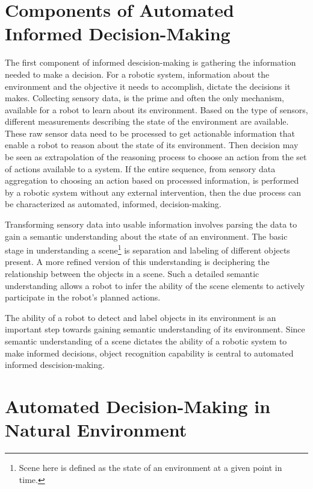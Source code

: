 \documentclass {udthesis}
\begin{document}
\section{Components of Automated Informed Decision-Making}

The first component of informed descision-making is gathering the information needed to make a decision. 
For a robotic system,
information about the environment and the objective it needs to accomplish, dictate the decisions it makes. 
Collecting sensory data, is the prime 
and often the only mechanism, available for a robot to learn about its environment. Based on the 
type of sensors, different measurements describing the state of the environment are available. 
These raw sensor data need to be processed to get actionable information that enable a robot to reason about the state of its environment. 
Then decision may be seen as extrapolation of the reasoning process to choose an action from the set of actions available to a system.
If the entire sequence, from sensory data aggregation to choosing an action based on processed information, is performed by
a robotic system without any external intervention, then the due process can be characterized as automated, informed, decision-making. 

Transforming sensory data into usable information involves parsing the data to gain a semantic understanding about the state of an environment.
The basic stage in understanding a scene\footnote{Scene here is defined as the state of an environment at a given point in time.} is separation and labeling of different objects present.
A more refined version of this understanding is deciphering the relationship between the objects in a scene.
Such a detailed semantic understanding allows a robot to infer the ability of the scene elements 
to actively participate in the robot's planned actions.

The ability of a robot to detect and label objects in its environment is an important step towards gaining semantic understanding of its environment.
Since semantic understanding of a scene dictates the ability of a robotic system to make informed decisions, object recognition capability
is central to automated informed descision-making.

\section{Automated Decision-Making in Natural Environment}
\end{document}

